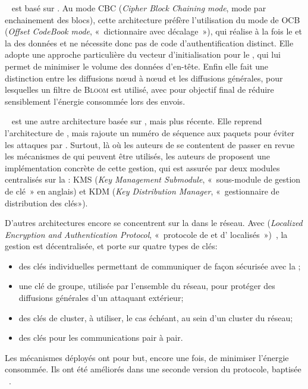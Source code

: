 ~\cite{LMPG07} est basé sur .
Au mode CBC (\textit{Cipher Block Chaining mode}, mode par enchainement des blocs), cette architecture préfère l'utilisation du mode de  OCB (\textit{Offset CodeBook mode}, « dictionnaire avec décalage »), qui réalise à la fois le  et la  des données et ne nécessite donc pas de code d'authentification distinct.
Elle adopte une approche particulière du vecteur d'initialisation pour le , qui lui permet de minimiser le volume des données d'en-tête.
Enfin elle fait une distinction entre les diffusions nœud à nœud et les diffusions générales, pour lesquelles un filtre de \textsc{Bloom} est utilisé, avec pour objectif final de réduire sensiblement l'énergie consommée lors des envois.

~\cite{CRS11} est une autre architecture basée sur , mais plus récente.
Elle reprend l'architecture de , mais rajoute un numéro de séquence aux paquets pour éviter les attaques par .
Surtout, là où les auteurs de  se contentent de passer en revue les mécanismes de  qui peuvent être utilisés, les auteurs de  proposent une implémentation concrète de cette gestion, qui est assurée par deux modules centralisés sur la \sdb: KMS (\textit{Key Management Submodule}, « sous-module de gestion de clé » en anglais) et KDM (\textit{Key Distribution Manager}, « gestionnaire de distribution des clés»).

D'autres architectures encore se concentrent sur la  dans le réseau.
Avec  (\textit{Localized Encryption and Authentication Protocol}, « protocole de  et d' localisés »)~\cite{ZSJ03}, la gestion est décentralisée, et porte sur quatre types de clés:
\begin{itemize}
    \item des clés individuelles permettant de communiquer de façon sécurisée avec la \sdb;
    \item une clé de groupe, utilisée par l'ensemble du réseau, pour protéger des diffusions générales d'un attaquant extérieur;
    \item des clés de cluster, à utiliser, le cas échéant, au sein d'un cluster du réseau;
    \item des clés pour les communications pair à pair.
\end{itemize}
Les mécanismes déployés ont pour but, encore une fois, de minimiser l'énergie consommée.
Ils ont été améliorés dans une seconde version du protocole, baptisée ~\cite{ZSJ06}.

